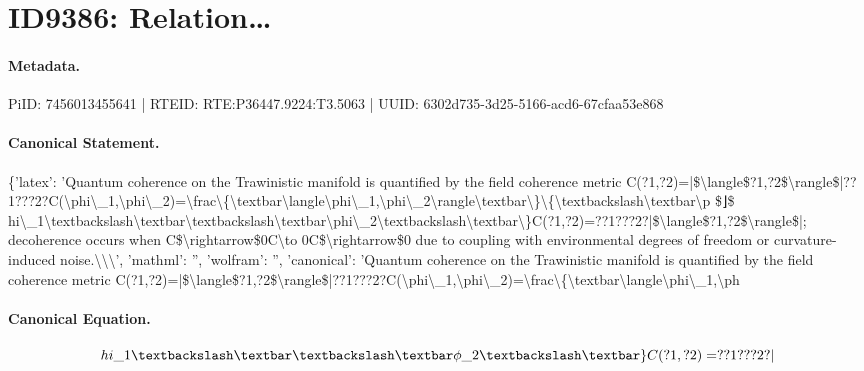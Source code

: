 \section*{ID9386: Relation…}
\paragraph{Metadata.}
PiID: 7456013455641 | RTEID: RTE:P36447.9224:T3.5063 | UUID: 6302d735-3d25-5166-acd6-67cfaa53e868

\paragraph{Canonical Statement.}
\{'latex': 'Quantum coherence on the Trawinistic manifold is quantified by the field coherence metric C(?1,?2)=|\$\textbackslash{}langle\$?1,?2\$\textbackslash{}rangle\$|??1???2?C(\textbackslash{}phi\textbackslash{}\_1,\textbackslash{}phi\textbackslash{}\_2)=\textbackslash{}frac\textbackslash{}\{\textbackslash{}textbar\textbackslash{}langle\textbackslash{}phi\textbackslash{}\_1,\textbackslash{}phi\textbackslash{}\_2\textbackslash{}rangle\textbackslash{}textbar\textbackslash{}\}\textbackslash{}\{\textbackslash{}textbackslash\textbackslash{}textbar\textbackslash{}p \$⌋\$ hi\textbackslash{}\_1\textbackslash{}textbackslash\textbackslash{}textbar\textbackslash{}textbackslash\textbackslash{}textbar\textbackslash{}phi\textbackslash{}\_2\textbackslash{}textbackslash\textbackslash{}textbar\textbackslash{}\}C(?1,?2)=??1???2?|\$\textbackslash{}langle\$?1,?2\$\textbackslash{}rangle\$|; decoherence occurs when C\$\textbackslash{}rightarrow\$0C\textbackslash{}to 0C\$\textbackslash{}rightarrow\$0 due to coupling with environmental degrees of freedom or curvature-induced noise.\textbackslash{}\textbackslash{}\textbackslash{}', 'mathml': '', 'wolfram': '', 'canonical': 'Quantum coherence on the Trawinistic manifold is quantified by the field coherence metric C(?1,?2)=|\$\textbackslash{}langle\$?1,?2\$\textbackslash{}rangle\$|??1???2?C(\textbackslash{}phi\textbackslash{}\_1,\textbackslash{}phi\textbackslash{}\_2)=\textbackslash{}frac\textbackslash{}\{\textbackslash{}textbar\textbackslash{}langle\textbackslash{}phi\textbackslash{}\_1,\textbackslash{}ph

\paragraph{Canonical Equation.}
\[
hi\_1\textbackslash\textbar\textbackslash\textbar\phi\_2\textbackslash\textbar\}C(?1,?2)=??1???2?|
\]

